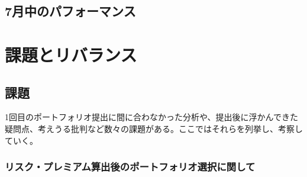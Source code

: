 \documentclass[11pt]{jreport}
\begin{document}
\section{7月中のパフォーマンス}
\chapter{課題とリバランス}
\section{課題}
1回目のポートフォリオ提出に間に合わなかった分析や、提出後に浮かんできた疑問点、考えうる批判など数々の課題がある。ここではそれらを列挙し、考察していく。
\subsection{リスク・プレミアム算出後のポートフォリオ選択に関して}
\end{document}
